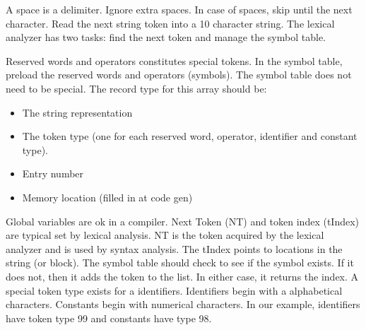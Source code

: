 A space is a delimiter.    Ignore extra spaces.   In case of spaces, skip until the next character.  Read the next string token into a 10 character string.  The lexical analyzer has two tasks: find the next token and manage the symbol table.   

Reserved words and operators constitutes special tokens.  In the symbol table, preload the reserved words and operators (symbols).    The symbol table does not need to be special.  The record type for this array should be:
\begin{itemize}
\item The string representation
\item The token type (one for each reserved word, operator, identifier and constant type).  
\item Entry number
\item Memory location (filled in at code gen)
\end{itemize}
Global variables are ok in a compiler.    Next Token (NT) and token index (tIndex) are typical set by lexical analysis.  NT is the token acquired by the lexical analyzer and is used by syntax analysis.  The tIndex points to locations in the string (or block).  The symbol table should check to see if the symbol exists.  If it does not, then it adds the token to the list.  In either case, it returns the index.   A special token type exists for a identifiers.    Identifiers begin with a alphabetical characters.  Constants begin with numerical characters.    In our example, identifiers have token type 99 and constants have type 98.  